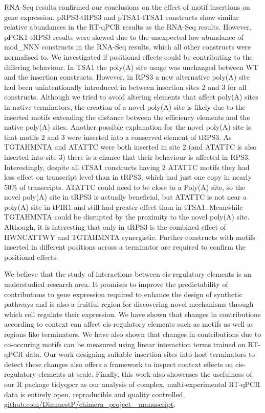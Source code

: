 \documentclass[../main.tex]{subfiles}
\begin{document}
RNA-Seq results confirmed our conclusions on the effect of motif insertions on gene expression. pRPS3-tRPS3 and pTSA1-tTSA1 constructs show similar relative abundances in the RT-qPCR results as the RNA-Seq results. 
However, pPGK1-tRPS3 results were skewed due to the unexpected low abundance of mod\_NNN constructs in the RNA-Seq results, which all other constructs were normalised to.
We investigated if positional effects could be contributing to the differing behaviour. 
In TSA1 the poly(A) site usage was unchanged between WT and the insertion constructs. 
However, in RPS3 a new alternative poly(A) site had been unintentionally introduced in between insertion sites 2 and 3 for all constructs. 
Although we tried to avoid altering elements that affect poly(A) sites in native terminators, the creation of a novel poly(A) site is likely due to the inserted motifs extending the distance between the efficiency elements and the native poly(A) sites.
Another possible explanation for the novel poly(A) site is that motifs 2 and 3 were inserted into a conserved element of tRPS3.
As TGTAHMNTA and ATATTC were both inserted in site 2 (and ATATTC is also inserted into site 3) there is a chance that their behaviour is affected in RPS3.
Interestingly, despite all tTSA1 constructs having 2 ATATTC motifs they had less effect on transcript level than in tRPS3, which had just one copy in nearly 50\% of transcripts.
ATATTC could need to be close to a Poly(A) site, so the novel poly(A) site in tRPS3 is actually beneficial, but ATATTC is not near a poly(A) site in tPIR1 and still had greater effect than in tTSA1.
Meanwhile TGTAHMNTA could be disrupted by the proximity to the novel poly(A) site.
Although, it is interesting that only in tRPS3 is the combined effect of HWNCATTWY and TGTAHMNTA synergistic.
Further constructs with motifs inserted in different positions across a terminator are required to confirm the positional effects.

We believe that the study of interactions between cis-regulatory elements is an understudied research area. 
It promises to improve the predictability of contributions to gene expression required to enhance the design of synthetic pathways and is also a fruitful region for discovering novel mechanisms through which cell regulate their expression. 
We have shown that changes in contributions according to context can affect cis-regulatory elements such as motifs as well as regions like terminators. 
We have also shown that changes in contributions due to co-occuring motifs can be measured using linear interaction terms trained on  RT-qPCR data. 
Our work designing suitable insertion sites into host terminators to detect these changes also offers a framework to inspect context effects on cis-regulatory elements at scale. 
Finally, this work also showcases the usefulness of our R package tidyqpcr as our analysis of complex, multi-experimental  RT-qPCR data is entirely open, reproducible and quality controlled, \href{https://github.com/DimmestP/chimera_project_manuscript}{github.com/DimmestP/chimera\_project\_ manuscript}.
\end{document}
